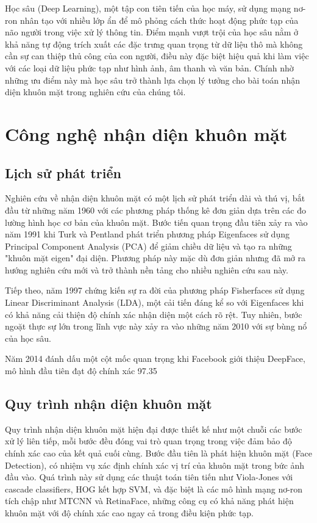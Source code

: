 \documentclass[12pt,a4paper]{report}
\begin{document}
Học sâu (Deep Learning), một tập con tiên tiến của học máy, sử dụng mạng nơ-ron nhân tạo với nhiều lớp ẩn để mô phỏng cách thức hoạt động phức tạp của não người trong việc xử lý thông tin. Điểm mạnh vượt trội của học sâu nằm ở khả năng tự động trích xuất các đặc trưng quan trọng từ dữ liệu thô mà không cần sự can thiệp thủ công của con người, điều này đặc biệt hiệu quả khi làm việc với các loại dữ liệu phức tạp như hình ảnh, âm thanh và văn bản. Chính nhờ những ưu điểm này mà học sâu trở thành lựa chọn lý tưởng cho bài toán nhận diện khuôn mặt trong nghiên cứu của chúng tôi.

\section{Công nghệ nhận diện khuôn mặt}
\subsection{Lịch sử phát triển}
Nghiên cứu về nhận diện khuôn mặt có một lịch sử phát triển dài và thú vị, bắt đầu từ những năm 1960 với các phương pháp thống kê đơn giản dựa trên các đo lường hình học cơ bản của khuôn mặt. Bước tiến quan trọng đầu tiên xảy ra vào năm 1991 khi Turk và Pentland phát triển phương pháp Eigenfaces sử dụng Principal Component Analysis (PCA) để giảm chiều dữ liệu và tạo ra những "khuôn mặt eigen" đại diện. Phương pháp này mặc dù đơn giản nhưng đã mở ra hướng nghiên cứu mới và trở thành nền tảng cho nhiều nghiên cứu sau này.

Tiếp theo, năm 1997 chứng kiến sự ra đời của phương pháp Fisherfaces sử dụng Linear Discriminant Analysis (LDA), một cải tiến đáng kể so với Eigenfaces khi có khả năng cải thiện độ chính xác nhận diện một cách rõ rệt. Tuy nhiên, bước ngoặt thực sự lớn trong lĩnh vực này xảy ra vào những năm 2010 với sự bùng nổ của học sâu.

Năm 2014 đánh dấu một cột mốc quan trọng khi Facebook giới thiệu DeepFace, mô hình đầu tiên đạt độ chính xác 97.35%

\subsection{Quy trình nhận diện khuôn mặt}
Quy trình nhận diện khuôn mặt hiện đại được thiết kế như một chuỗi các bước xử lý liên tiếp, mỗi bước đều đóng vai trò quan trọng trong việc đảm bảo độ chính xác cao của kết quả cuối cùng. Bước đầu tiên là phát hiện khuôn mặt (Face Detection), có nhiệm vụ xác định chính xác vị trí của khuôn mặt trong bức ảnh đầu vào. Quá trình này sử dụng các thuật toán tiên tiến như Viola-Jones với cascade classifiers, HOG kết hợp SVM, và đặc biệt là các mô hình mạng nơ-ron tích chập như MTCNN và RetinaFace, những công cụ có khả năng phát hiện khuôn mặt với độ chính xác cao ngay cả trong điều kiện phức tạp.
\end{document}
